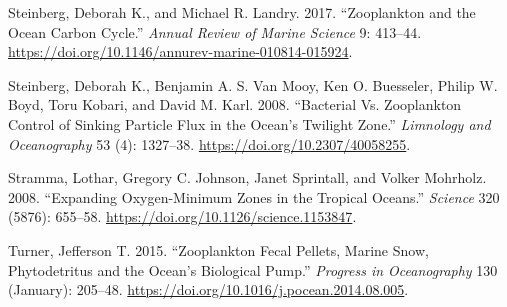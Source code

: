 \documentclass[]{article}
\begin{document}
\leavevmode\hypertarget{ref-steinbergZooplanktonOceanCarbon2017}{}%
Steinberg, Deborah K., and Michael R. Landry. 2017. ``Zooplankton and
the Ocean Carbon Cycle.'' \emph{Annual Review of Marine Science} 9:
413--44. \url{https://doi.org/10.1146/annurev-marine-010814-015924}.

\leavevmode\hypertarget{ref-steinbergBacterialVsZooplankton2008}{}%
Steinberg, Deborah K., Benjamin A. S. Van Mooy, Ken O. Buesseler, Philip
W. Boyd, Toru Kobari, and David M. Karl. 2008. ``Bacterial Vs.
Zooplankton Control of Sinking Particle Flux in the Ocean's Twilight
Zone.'' \emph{Limnology and Oceanography} 53 (4): 1327--38.
\url{https://doi.org/10.2307/40058255}.

\leavevmode\hypertarget{ref-strammaExpandingOxygenMinimumZones2008}{}%
Stramma, Lothar, Gregory C. Johnson, Janet Sprintall, and Volker
Mohrholz. 2008. ``Expanding Oxygen-Minimum Zones in the Tropical
Oceans.'' \emph{Science} 320 (5876): 655--58.
\url{https://doi.org/10.1126/science.1153847}.

\leavevmode\hypertarget{ref-turnerZooplanktonFecalPellets2015}{}%
Turner, Jefferson T. 2015. ``Zooplankton Fecal Pellets, Marine Snow,
Phytodetritus and the Ocean's Biological Pump.'' \emph{Progress in
Oceanography} 130 (January): 205--48.
\url{https://doi.org/10.1016/j.pocean.2014.08.005}.
\end{document}
